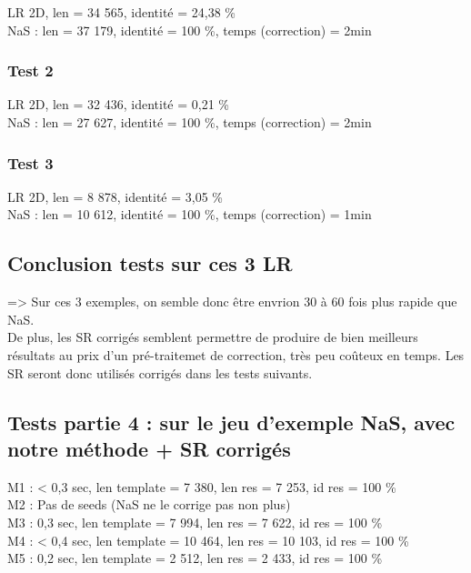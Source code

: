 \documentclass[12pt]{article}
\begin{document}
LR 2D, len = 34 565, identité = 24,38 \% \\

NaS : len = 37 179, identité = 100 \%, temps (correction) = 2min

\subsubsection{Test 2}

LR 2D, len = 32 436, identité = 0,21 \% \\

NaS : len = 27 627, identité = 100 \%, temps (correction) = 2min

\subsubsection{Test 3}

LR 2D, len = 8 878, identité = 3,05 \% \\

NaS : len = 10 612, identité = 100 \%, temps (correction) = 1min

\subsection{Conclusion tests sur ces 3 LR}

=> Sur ces 3 exemples, on semble donc être envrion 30 à 60 fois plus rapide que NaS. \\

De plus, les SR corrigés semblent permettre de produire de bien meilleurs résultats au prix d'un pré-traitemet de correction, très peu coûteux
en temps. Les SR seront donc utilisés corrigés dans les tests suivants.

\subsection{Tests partie 4 : sur le jeu d'exemple NaS, avec notre méthode + SR corrigés}

M1 : < 0,3 sec, len template = 7 380, len res = 7 253, id res = 100 \% \\
M2 : Pas de seeds (NaS ne le corrige pas non plus) \\
M3 : 0,3 sec, len template = 7 994, len res = 7 622, id res = 100 \% \\
M4 : < 0,4 sec, len template = 10 464, len res = 10 103, id res = 100 \% \\
M5 : 0,2 sec, len template = 2 512, len res = 2 433, id res = 100 \% \\
\end{document}
